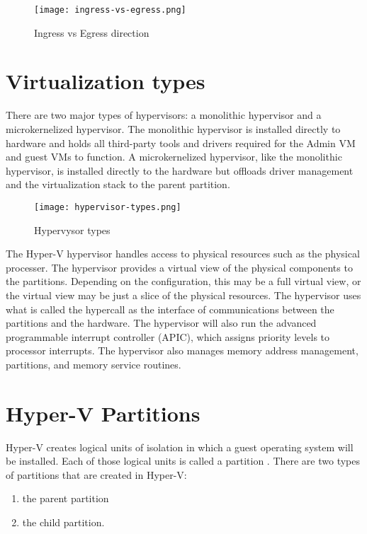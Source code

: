 \begin{figure}[h]
\centering
\texttt{[image: ingress-vs-egress.png]}
\caption{Ingress vs Egress direction}
\label{ingress-vs-egress}
\end{figure}

\vspace{5mm}
\section{Virtualization types}
\vspace{5mm}
There are two major types of hypervisors: a monolithic hypervisor and a microkernelized hypervisor. The monolithic hypervisor is installed directly to hardware and holds
all third-party tools and drivers required for the Admin VM and guest VMs to function. A microkernelized hypervisor, like the monolithic hypervisor, is installed directly to the
hardware but offloads driver management and the virtualization stack to the parent partition. \cite{BOOK:3}

\vspace{5mm}

\begin{figure}[h]
\centering
\texttt{[image: hypervisor-types.png]}
\caption{Hypervysor types}
\label{hypervisor-types}
\end{figure}

\vspace{5mm}

The Hyper-V hypervisor handles access to physical resources such as the physical processer. The hypervisor provides a virtual view of the physical components to the
partitions. Depending on the configuration, this may be a full virtual view, or the virtual view may be just a slice of the physical resources. The hypervisor uses what is called the
hypercall as the interface of communications between the partitions and the hardware. The hypervisor will also run the advanced programmable interrupt controller (APIC),
which assigns priority levels to processor interrupts. The hypervisor also manages memory address management, partitions, and memory service routines.

\vspace{5mm}
\section{Hyper-V Partitions}
\vspace{5mm}

Hyper-V creates logical units of isolation in which a guest operating system will be installed. Each of those logical units is called a partition . There are two types of partitions that are created in Hyper-V:
\begin{enumerate}
	\item the parent partition 
	\item the child partition.
\end{enumerate}

